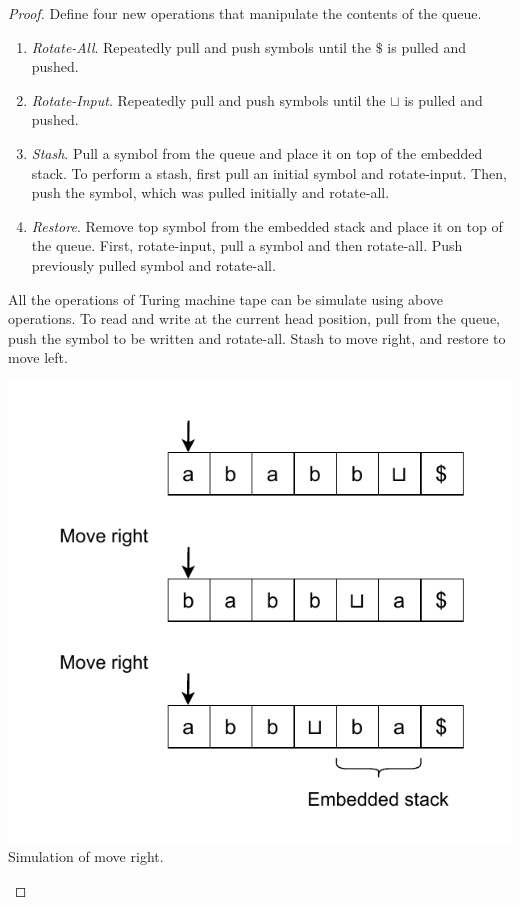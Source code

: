 \documentclass[11pt]{article}
\begin{document}
\begin{proof}
Define four new operations that manipulate the contents of the queue.
\begin{enumerate}
\item \textit{Rotate-All}. Repeatedly pull and push symbols until the $\$$ is pulled and pushed.
\item \textit{Rotate-Input}. Repeatedly pull and push symbols until the $\sqcup$ is pulled and pushed.
\item \textit{Stash}. Pull a symbol from the queue and place it on top of the embedded stack. To perform a stash, first pull an initial symbol and rotate-input. Then, push the symbol, which was pulled initially and rotate-all.
\item \textit{Restore}. Remove top symbol from the embedded stack and place it on top of the queue. First, rotate-input, pull a symbol and then rotate-all. Push previously pulled symbol and rotate-all.
\end{enumerate}

All the operations of Turing machine tape can be simulate using above operations. To read and write at the current head position, pull from the queue, push the symbol to be written and rotate-all. Stash to move right, and restore to move left.

\begin{center}
\includegraphics[scale=0.8]{Figures/Problem3.14b.pdf} \\
Simulation of move right.
\end{center}
\end{proof}
\end{document}
